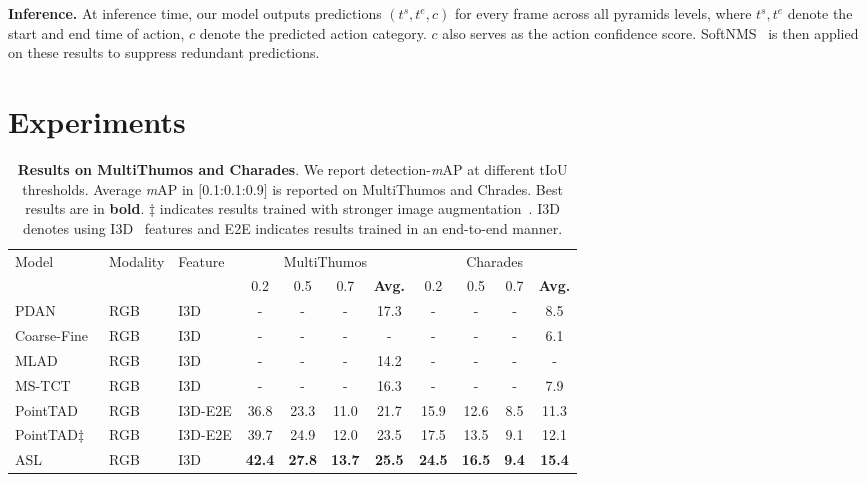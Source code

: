 \documentclass[10pt,twocolumn,letterpaper]{article}
\begin{document}
\textbf{Inference.} At inference time, our model outputs predictions $(t^s,t^e,c)$ for every frame across all pyramids levels, where $t^s,t^e$ denote the start and end time of action, $c$ denote the predicted action category. $c$ also serves as the action confidence score. SoftNMS~\cite{softnms} is then applied on these results to suppress redundant predictions.

\section{Experiments}

\begin{table*}[ht]
 \centering 
 \small
 \caption{\label{tab:mthumosandcharades} \textbf{Results on MultiThumos and Charades}. We report detection-\textit{m}AP at different tIoU thresholds. Average \textit{m}AP in $[$0.1:0.1:0.9$]$ is reported on MultiThumos and Chrades. Best results are in \textbf{bold}. $\ddagger$ indicates results trained with stronger image augmentation~\cite{tanpointtad, tadtr}. I3D denotes using I3D~\cite{i3d} features and E2E indicates results trained in an end-to-end manner.}
 \vspace{0.5em}
 {
  \begin{tabular}{l|l|l|cccc|cccc} 
  \toprule
  \multirow{2}{*}{Model} & \multirow{2}{*}{Modality} & \multirow{2}{*}{Feature} & \multicolumn{4}{c}{MultiThumos} & \multicolumn{4}{c}{Charades}\tabularnewline
 & & & 0.2 & 0.5 & 0.7 & \textbf{Avg.} & 0.2 & 0.5 & 0.7 & \textbf{Avg.} \\

    \hline
    PDAN~\cite{dai2021pdan} & RGB & I3D & - & - & - & 17.3  & - & - & - & 8.5  \tabularnewline
    Coarse-Fine~\cite{kahatapitiya2021coarsefine} & RGB & I3D & - & - & -& - & - & - & - & 6.1  \tabularnewline
    MLAD~\cite{mlad} & RGB & I3D & - & - & - & 14.2  & - & - & - & - \tabularnewline
    MS-TCT~\cite{dai2022mstct} & RGB & I3D & - & - & - & 16.3  & - & - & - & 7.9   \tabularnewline
    PointTAD~\cite{tanpointtad} & RGB & I3D-E2E & 36.8 & 23.3 & 11.0 & 21.7 & 15.9 & 12.6 & 8.5 & 11.3 \tabularnewline
    PointTAD$\ddagger$~\cite{tanpointtad} & RGB & I3D-E2E & 39.7 & 24.9 & 12.0 & 23.5 & 17.5 & 13.5 & 9.1 & 12.1 \tabularnewline
   \hline
    ASL & RGB & I3D & \textbf{42.4} & \textbf{27.8} & \textbf{13.7} & \textbf{25.5} & \textbf{24.5} & \textbf{16.5} & \textbf{9.4} & \textbf{15.4} \tabularnewline  \bottomrule
  \end{tabular}
 }
\end{table*}
\end{document}
